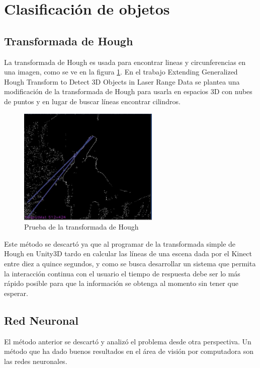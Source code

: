 \section{Clasificación de objetos}  
    \subsection{Transformada de Hough}
        La transformada de Hough es usada para encontrar lineas y circunferencias en una imagen, como se ve en la figura \ref{fig:unityhough}. En el trabajo Extending Generalized Hough Transform to Detect 3D Objects in
        Laser Range Data se plantea una modificación de la transformada de Hough para usarla en espacios 3D con nubes de puntos y en lugar de buscar líneas encontrar cilindros.\\
        
        
        \begin{figure}[!htb]
            \centering
            \includegraphics[width=0.6\textwidth]{02Desarrollo/RANSAC/imagenes/hough.JPG}
            \caption{Prueba de la transformada de Hough} 
            \label{fig:unityhough}
        \end{figure}
    
        Este método se descartó ya que al programar de la transformada simple de Hough en Unity3D tardo en calcular las líneas de una escena dada por el Kinect entre diez a quince segundos, y como se busca desarrollar un sistema que permita la interacción continua con el usuario el tiempo de respuesta debe ser lo más rápido posible para que la información se obtenga al momento sin tener que esperar.\\
        
    \subsection{Red Neuronal}
        El método anterior se descartó y analizó el problema desde otra perspectiva. Un método que ha dado buenos resultados en el área de visión por computadora son las redes neuronales.\\
        
